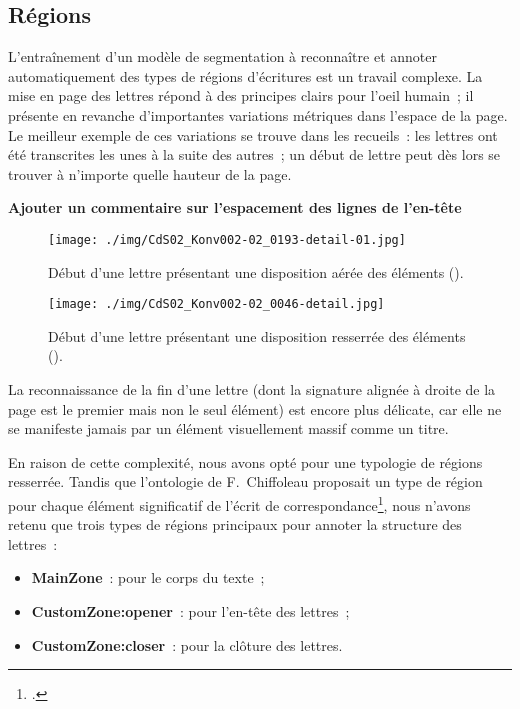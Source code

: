 \documentclass[a4paper,12pt,twoside]{book}
\begin{document}
			\subsection{Régions}
				L'entraînement d'un modèle de segmentation à reconnaître et annoter automatiquement des types de régions d'écritures est un travail complexe. La mise en page des lettres répond à des principes clairs pour l'oeil humain~; il présente en revanche d'importantes variations métriques dans l'espace de la page. Le meilleur exemple de ces variations se trouve dans les recueils~: les lettres ont été transcrites les unes à la suite des autres~; un début de lettre peut dès lors se trouver à n'importe quelle hauteur de la page. 
				
				\textbf{Ajouter un commentaire sur l'espacement des lignes de l'en-tête}
				
				\begin{figure}[!h]
					\centering
					\texttt{[image: ./img/CdS02\_Konv002-02\_0193-detail-01.jpg]}%
					\caption{Début d'une lettre présentant une disposition aérée des éléments (\cite{salmCorrespondanceGeneraleSeconde}).}%
					\label{}%
				\end{figure}
			
				\begin{figure}[!h]
					\centering
					\texttt{[image: ./img/CdS02\_Konv002-02\_0046-detail.jpg]}%
					\caption{Début d'une lettre présentant une disposition resserrée des éléments (\cite{salmCorrespondanceGeneraleSeconde}).}%
					\label{}%
				\end{figure}
				
				La reconnaissance de la fin d'une lettre (dont la signature alignée à droite de la page est le premier mais non le seul élément) est encore plus délicate, car elle ne se manifeste jamais par un élément visuellement massif comme un titre.
				
				En raison de cette complexité, nous avons opté pour une typologie de régions resserrée. Tandis que l'ontologie de F.~Chiffoleau proposait un type de région pour chaque élément significatif de l'écrit de correspondance\footcite{chiffoleauCorrespondanceLangueFrancaise2021}, nous n'avons retenu que trois types de régions principaux pour annoter la structure des lettres~:
				
				\begin{itemize}
					\item \textbf{MainZone}~: pour le corps du texte~;
					\item \textbf{CustomZone:opener}~: pour l'en-tête des lettres~;
					\item \textbf{CustomZone:closer}~: pour la clôture des lettres.
				\end{itemize}
			
\end{document}
